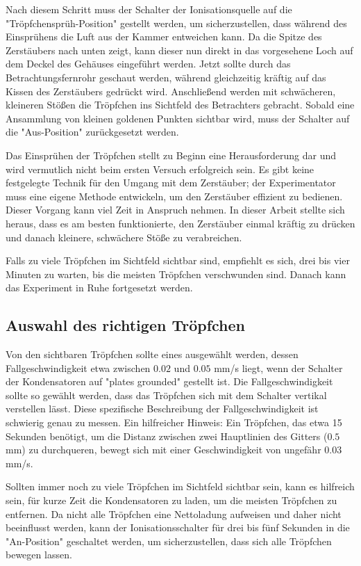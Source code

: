 Nach diesem Schritt muss der Schalter der Ionisationsquelle auf die "Tröpfchensprüh-Position" gestellt werden, um sicherzustellen, dass während des Einsprühens die Luft aus der Kammer entweichen kann. Da die Spitze des Zerstäubers nach unten zeigt, kann dieser nun direkt in das vorgesehene Loch auf dem Deckel des Gehäuses eingeführt werden. Jetzt sollte durch das Betrachtungsfernrohr geschaut werden, während gleichzeitig kräftig auf das Kissen des Zerstäubers gedrückt wird. Anschließend werden mit schwächeren, kleineren Stößen die Tröpfchen ins Sichtfeld des Betrachters gebracht. Sobald eine Ansammlung von kleinen goldenen Punkten sichtbar wird, muss der Schalter auf die "Aus-Position" zurückgesetzt werden.

Das Einsprühen der Tröpfchen stellt zu Beginn eine Herausforderung dar und wird vermutlich nicht beim ersten Versuch erfolgreich sein. Es gibt keine festgelegte Technik für den Umgang mit dem Zerstäuber; der Experimentator muss eine eigene Methode entwickeln, um den Zerstäuber effizient zu bedienen. Dieser Vorgang kann viel Zeit in Anspruch nehmen. In dieser Arbeit stellte sich heraus, dass es am besten funktionierte, den Zerstäuber einmal kräftig zu drücken und danach kleinere, schwächere Stöße zu verabreichen.

Falls zu viele Tröpfchen im Sichtfeld sichtbar sind, empfiehlt es sich, drei bis vier Minuten zu warten, bis die meisten Tröpfchen verschwunden sind. Danach kann das Experiment in Ruhe fortgesetzt werden.

\subsection{Auswahl des richtigen Tröpfchen}\label{sub:auswahlTropfen}
Von den sichtbaren Tröpfchen sollte eines ausgewählt werden, dessen Fallgeschwindigkeit etwa zwischen $0.02$ und $0.05$ mm/s liegt, wenn der Schalter der Kondensatoren auf "plates grounded" gestellt ist. Die Fallgeschwindigkeit sollte so gewählt werden, dass das Tröpfchen sich mit dem Schalter vertikal verstellen lässt. Diese spezifische Beschreibung der Fallgeschwindigkeit ist schwierig genau zu messen. Ein hilfreicher Hinweis: Ein Tröpfchen, das etwa 15 Sekunden benötigt, um die Distanz zwischen zwei Hauptlinien des Gitters ($0.5$ mm) zu durchqueren, bewegt sich mit einer Geschwindigkeit von ungefähr $0.03$ mm/s.

Sollten immer noch zu viele Tröpfchen im Sichtfeld sichtbar sein, kann es hilfreich sein, für kurze Zeit die Kondensatoren zu laden, um die meisten Tröpfchen zu entfernen. Da nicht alle Tröpfchen eine Nettoladung aufweisen und daher nicht beeinflusst werden, kann der Ionisationsschalter für drei bis fünf Sekunden in die "An-Position" geschaltet werden, um sicherzustellen, dass sich alle Tröpfchen bewegen lassen.

